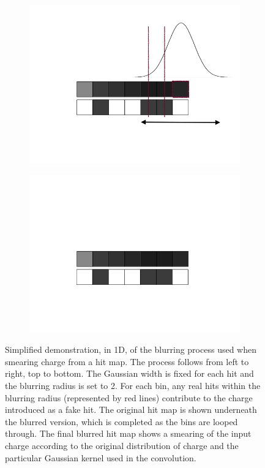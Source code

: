 \begin{figure}
\begin{subfigure}[t]{0.3\linewidth}
  \end{subfigure}
  \hfill
  \begin{subfigure}[t]{0.3\linewidth}
    \centering
    \includegraphics[width=\textwidth]{blurring8.png}
  \end{subfigure}
  \hfill
  \begin{subfigure}[t]{0.3\linewidth}
    \centering
    \includegraphics[width=\textwidth]{blurring9.png}
  \end{subfigure}
  \caption[Simplified demonstration, in 1D, of the blurring process used when smearing charge from a hit map.]{Simplified demonstration, in 1D, of the blurring process used when smearing charge from a hit map.  The process follows from left to right, top to bottom.  The Gaussian width is fixed for each hit and the blurring radius is set to 2.  For each bin, any real hits within the blurring radius (represented by red lines) contribute to the charge introduced as a fake hit.  The original hit map is shown underneath the blurred version, which is completed as the bins are looped through.  The final blurred hit map shows a smearing of the input charge according to the original distribution of charge and the particular Gaussian kernel used in the convolution.}
  \label{fig:BlurringProcess}
\end{figure}

